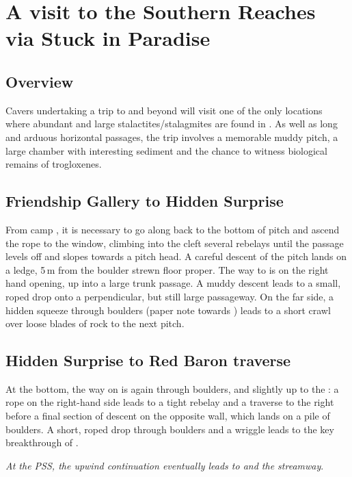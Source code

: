 \section{A visit to the Southern Reaches via Stuck in Paradise}

\subsection{Overview} 
Cavers undertaking a trip to  and beyond will visit one of the only locations where abundant and large stalactites/stalagmites are found in . As well as long and arduous horizontal passages, the trip involves a memorable muddy pitch, a large chamber with interesting sediment and the chance to witness biological remains of trogloxenes.

\subsection{Friendship Gallery to Hidden Surprise}
From camp , it is necessary to go along  back to the bottom of  pitch and ascend the rope to the  window, climbing into the cleft several rebelays until the passage levels off and slopes towards a pitch head. A careful descent of the  pitch lands on a ledge, 5\,m from the boulder strewn floor proper. The way to  is on the right hand opening, up into a large trunk passage. A muddy descent leads to a small, roped drop onto a perpendicular, but still large passageway. On the far side, a hidden squeeze through boulders (paper note towards ) leads to a short crawl over loose blades of rock to the next pitch.

\subsection{Hidden Surprise to Red Baron traverse}
At the bottom, the way on is again through boulders, and slightly up to the : a rope on the right-hand side leads to a tight rebelay and a traverse to the right before a final section of descent on the opposite wall, which lands on a pile of boulders. A short, roped drop through boulders and a wriggle leads to the key breakthrough of . 

\textit{At the PSS, the upwind continuation eventually leads to  and the  streamway}. 

